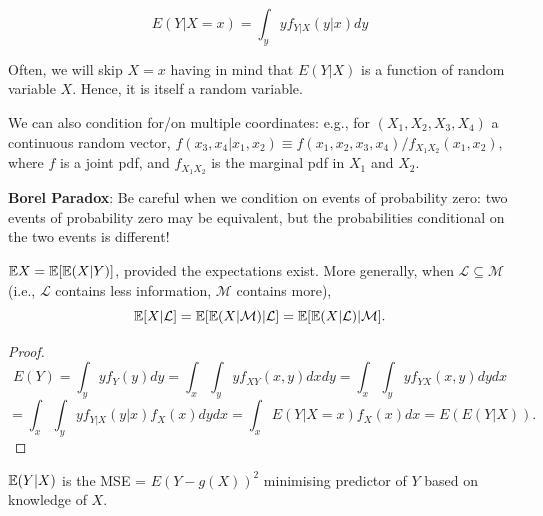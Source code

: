 \documentclass[DIV=14,titlepage=false]{scrreprt}
\begin{document}
\[ E(Y|X = x) = \int_{y} y f_{Y|X}(y|x) dy \]

Often, we will skip \( X = x \) having in mind that \( E(Y|X) \) is a function of random variable \( X \). Hence, it is itself a random variable.

We can also condition for/on multiple coordinates: e.g., for $ (X_1, X_2, X_3, X_4) $ a continuous random vector, $ f(x_3, x_4|x_1, x_2) \equiv f(x_1, x_2, x_3, x_4) / f_{X_1 X_2}(x_1, x_2) $, where $ f $ is a joint pdf, and $ f_{X_1 X_2} $ is the marginal pdf in $ X_1 $ and $ X_2 $.

\begin{note}
  \textbf{Borel Paradox}: Be careful when we condition on events of probability zero: two events of probability zero may be equivalent, but the probabilities conditional on the two events is different!
\end{note}

\begin{theorem}
$ \mathbb{E} X = \mathbb{E} [ \mathbb{E} (X|Y)] $, provided the expectations exist. More generally, when $ \mathcal{L} \subseteq \mathcal{M} $ (i.e., $ \mathcal{L} $ contains less information, $ \mathcal{M} $ contains more),
$$ \mathbb{E} [X | \mathcal{L} ] = \mathbb{E} [ \mathbb{E} (X | \mathcal{M} ) | \mathcal{L} ] = \mathbb{E} [ \mathbb{E} (X | \mathcal{L} ) | \mathcal{M} ] . $$
\end{theorem}

\begin{proof}
  \[
    E(Y) = \int_{y} yf_Y(y)dy = \int_{x} \int_{y} yf_{XY}(x, y)dxdy = \int_{x} \int_{y} yf_{YX}(x, y)dydx
    \]
    \[
    = \int_{x} \int_{y} yf_{Y|X}(y|x)f_X(x)dydx = \int_{x} E(Y|X = x)f_X(x)dx = E(E(Y|X)).
    \]
    
\end{proof}

\begin{theorem}
  $ \mathbb{E} (Y|X) $ is the MSE = $E(Y - g(X))^2$ minimising predictor of $ Y $ based on knowledge of $ X $.
\end{theorem}
\end{document}
